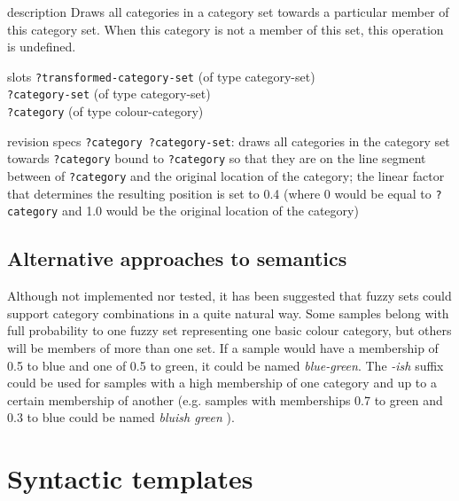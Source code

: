 
\begin{explanation}{description}
  Draws all categories in a category set towards a particular member
  of this category set. When this category is not a member of this
  set, this operation is undefined.
\end{explanation}

\begin{explanation}{slots}
  \verb+?transformed-category-set+ (of type category-set) \\
  \verb+?category-set+ (of type category-set) \\
  \verb+?category+ (of type colour-category)
\end{explanation}

\begin{explanation}{revision specs}
  \verb+?category ?category-set+: draws all categories in the category
  set towards \verb+?category+ bound to \verb+?category+ so that they
  are on the line segment between of \verb+?category+ and the original
  location of the category; the linear factor that determines the
  resulting position is set to 0.4 (where 0 would be equal to
  \verb+?category+ and 1.0 would be the original location of the
  category)
\end{explanation}

\subsection{Alternative approaches to semantics}

Although not implemented nor tested, it has been suggested that fuzzy
sets could support category combinations in a quite natural way. Some
samples belong with full probability to one fuzzy set representing one
basic colour category, but others will be members of more than one
set. If a sample would have a membership of 0.5 to blue and one of 0.5 to
green, it could be named \textit{blue-green}. The \textit{-ish} suffix could be
used for samples with a high membership of one category and up to a
certain membership of another (e.g. samples with memberships 0.7 to
green and 0.3 to blue could be named \textit{bluish green}
\citep{benavente08parametric}).

\section{Syntactic templates}

